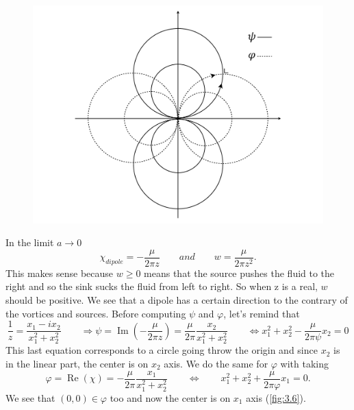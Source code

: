 		\begin{figure}
		\vspace{-5mm}	
		\includegraphics[scale=0.12]{ch3/6}	
		\label{fig:3.6}
		\end{figure}
		In the limit $a\rightarrow 0$ 
		\begin{equation}
			\chi _{dipole} = -\frac{\mu}{2\pi z} \qquad and \qquad w= \frac{\mu}{2\pi z^2}.
		\end{equation}
		This makes sense because $w\geq 0$ means that the source pushes the fluid to the right and so the sink sucks the fluid from left to right. So when z is a real, $w$ should be positive. We see that a dipole has a certain direction to the contrary of the vortices and sources. Before computing $\psi$ and $\varphi$, let's remind that
		\begin{equation}
			\frac{1}{z} = \frac{x_1-ix_2}{x_1^2+x_2^2} \qquad \Rightarrow \psi = \operatorname{Im}(-\frac{\mu}{2\pi z}) = \frac{\mu}{2\pi}\frac{x_2}{x_1^2+x_2^2} \qquad \Leftrightarrow x_1^2+x_2^2-\frac{\mu}{2\pi\psi}x_2 = 0
		\end{equation}
		This last equation corresponds to a circle going throw the origin and since $x_2$ is in the linear part, the center is on $x_2$ axis. We do the same for $\varphi$ with taking 
		\begin{equation}
			\varphi = \operatorname{Re}(\chi) = -\frac{\mu}{2\pi}\frac{x_1}{x_1^2+x_2^2} \qquad \Leftrightarrow \qquad x_1^2+x_2^2+\frac{\mu}{2\pi\varphi}x_1 = 0.
		\end{equation}
		We see that $(0,0) \in \varphi$ too and now the center is on $x_1$ axis (\autoref{fig:3.6}). 
		

